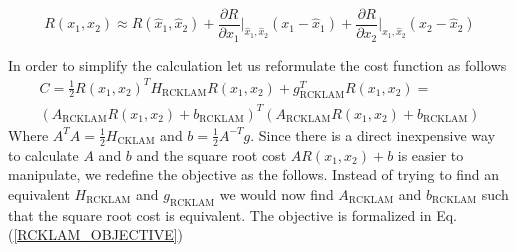 \begin{equation}
  R(x_1, x_2) \approx R(\hat x_1, \hat x_2) + \frac{\partial R} {\partial x_1}\biggr\rvert_{\hat x_1, \hat x_2} (x_1 - \hat x_1)+ \frac{\partial R} {\partial x_2}\biggr\rvert_{\hat x_1, \hat x_2} (x_2 - \hat x_2)
	\label{RCKLAM_LINEAR_COST}
\end{equation}

In order to simplify the calculation let us reformulate the cost function as follows
\begin{equation}
  \begin{split}
    C = \frac{1}{2}R(x_1, x_2)^TH_\mathrm{RCKLAM}R(x_1, x_2) + g_\mathrm{RCKLAM}^TR(x_1, x_2) = \\ (A_\mathrm{RCKLAM}R(x_1, x_2) + b_\mathrm{RCKLAM})^T(A_\mathrm{RCKLAM}R(x_1, x_2) + b_\mathrm{RCKLAM})
    \label{COST_RCKLAM_FACTORIZED}
    \end{split}
\end{equation}
 Where $A^TA = \frac{1}{2}H_\mathrm{CKLAM}$ and $b = \frac{1}{2} A^{-T}g$. Since there is a direct inexpensive way to calculate $A$ and $b$ and the square root cost $AR(x_1, x_2) + b$ is easier to manipulate, we redefine the objective as the follows. Instead of trying to find an equivalent $H_\mathrm{RCKLAM}$ and $g_\mathrm{RCKLAM}$ we would now find $A_\mathrm{RCKLAM}$ and $b_\mathrm{RCKLAM}$ such that the square root cost is equivalent. The objective is formalized in Eq.(\ref{RCKLAM_OBJECTIVE})


